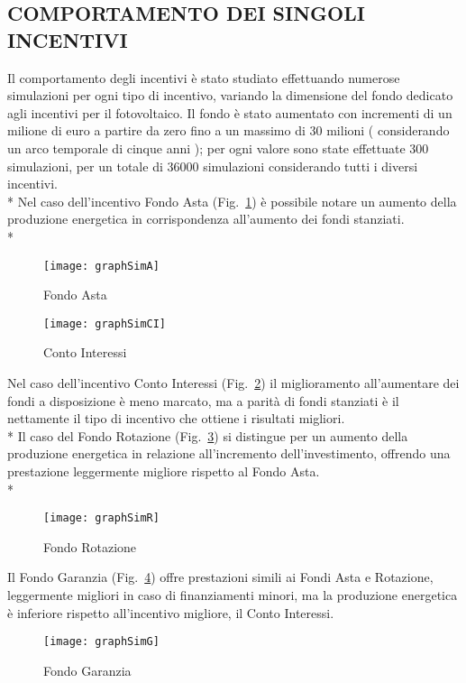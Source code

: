 \documentclass[12pt,a4paper,openright,twoside]{report}
\begin{document}
\subsection{COMPORTAMENTO DEI SINGOLI INCENTIVI}
Il comportamento degli incentivi è stato studiato effettuando numerose simulazioni per ogni tipo di incentivo, variando la dimensione del fondo dedicato agli incentivi per il fotovoltaico. Il fondo è stato aumentato con incrementi di un milione di euro a partire da zero  fino a un massimo di 30 milioni ( considerando un arco temporale di cinque anni ); per ogni valore sono state effettuate 300 simulazioni, per un totale di 36000 simulazioni considerando tutti i diversi incentivi.\\*
Nel caso dell'incentivo Fondo Asta (Fig.~\ref{graphSimA}) è possibile notare un aumento della produzione energetica in corrispondenza all'aumento dei fondi stanziati.\\*
\begin{figure}[hbt]
	\begin{center}
	\texttt{[image: graphSimA]}
	\end{center}
	\caption{Fondo Asta}
  	\label{graphSimA}
\end{figure}

\begin{figure}[htb]
	\begin{center}
	\texttt{[image: graphSimCI]}
	\end{center}
	\caption{Conto Interessi}
  	\label{graphSimCI}
\end{figure}
Nel caso dell'incentivo Conto Interessi (Fig.~\ref{graphSimCI}) il miglioramento all'aumentare dei fondi a disposizione è meno marcato, ma a parità di fondi stanziati è il nettamente il tipo di incentivo che ottiene i risultati migliori.\\*
Il caso del Fondo Rotazione (Fig.~\ref{graphSimR}) si distingue per un aumento della produzione energetica in relazione all'incremento dell'investimento, offrendo una prestazione leggermente migliore rispetto al Fondo Asta.\\*
\begin{figure}[htb]
	\begin{center}
	\texttt{[image: graphSimR]}
	\end{center}
	\caption{Fondo Rotazione}
  	\label{graphSimR}
\end{figure}
Il Fondo Garanzia (Fig.~\ref{graphSimG}) offre prestazioni simili ai Fondi Asta e Rotazione, leggermente migliori in caso di finanziamenti minori, ma la produzione energetica è inferiore rispetto all'incentivo migliore, il Conto Interessi.
\begin{figure}[htb]
	\begin{center}
	\texttt{[image: graphSimG]}
	\end{center}
	\caption{Fondo Garanzia}
  	\label{graphSimG}
\end{figure}
\end{document}

